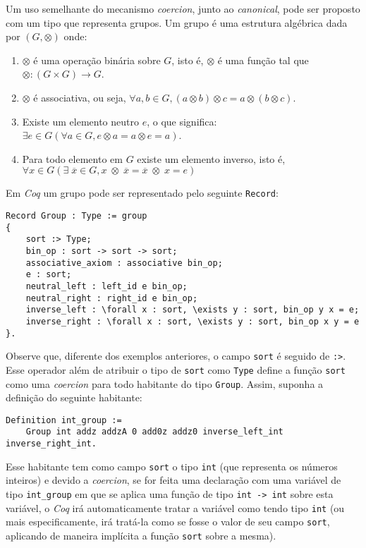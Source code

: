 Um uso semelhante do mecanismo \textit{coercion}, junto ao \textit{canonical}, pode ser proposto com um tipo que representa grupos. Um grupo é uma estrutura algébrica dada por $(G, \otimes)$ onde:
\begin{enumerate}
    \item $\otimes$ é uma operação binária sobre $G$, isto é, $\otimes$ é uma função tal que $\otimes : (G \times G) \rightarrow G$.
    \item $\otimes$ é associativa, ou seja, $\forall a, b \in G, (a \otimes b) \otimes c = a \otimes (b \otimes c)$.
    \item Existe um elemento neutro $e$, o que significa: $\exists e \in G (\forall a \in G, e \otimes a = a \otimes e = a)$. 
    \item Para todo elemento em $G$ existe um elemento inverso, isto é, \\
    $\forall x \in G (\exists \;\overline{x} \in G, x \;\otimes\; \overline{x} = \overline{x} \;\otimes\; x = e)$
\end{enumerate}
Em \textit{Coq} um grupo pode ser representado pelo seguinte \lstinline[language = coq]$Record$:
    \begin{lstlisting}[language = coq,frame=single,tabsize=1]
Record Group : Type := group 
{
    sort :> Type;
    bin_op : sort -> sort -> sort;
    associative_axiom : associative bin_op;
    e : sort;
    neutral_left : left_id e bin_op;
    neutral_right : right_id e bin_op;
    inverse_left : \forall x : sort, \exists y : sort, bin_op y x = e; 
    inverse_right : \forall x : sort, \exists y : sort, bin_op x y = e 
}.
    \end{lstlisting}
Observe que, diferente dos exemplos anteriores, o campo \lstinline[language = coq]$sort$ é seguido de \lstinline[language = coq]$:>$. Esse operador além de atribuir o tipo de \lstinline[language = coq]$sort$ como \lstinline[language = coq]$Type$
define a função \lstinline[language = coq]$sort$ como uma \textit{coercion} para todo habitante do tipo \lstinline[language = coq]$Group$. Assim, suponha a definição do seguinte habitante:
    \begin{lstlisting}[language = coq,frame=single,tabsize=1]
Definition int_group := 
    Group int addz addzA 0 add0z addz0 inverse_left_int inverse_right_int.
    \end{lstlisting}
Esse habitante tem como campo \lstinline[language = coq]$sort$ o tipo \lstinline[language = coq]$int$ (que representa os números inteiros) e devido a \textit{coercion}, se for feita uma declaração com uma variável de tipo \lstinline[language = coq]$int_group$ em que se aplica uma função de tipo \lstinline[language = coq]$int -> int$ sobre esta variável, o \textit{Coq} irá automaticamente tratar a variável como tendo tipo \lstinline[language = coq]$int$ (ou mais especificamente, irá tratá-la como se fosse o valor de seu campo \lstinline[language = coq]$sort$, aplicando de maneira implícita a função \lstinline[language = coq]$sort$ sobre a mesma).

